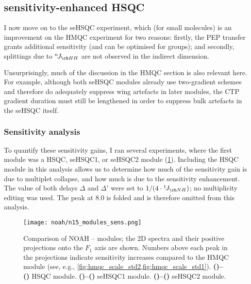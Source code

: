 \subsection{\texorpdfstring{\nitrogen{}}{15N} sensitivity-enhanced HSQC}
\label{subsec:noah__sehsqc_n}

I now move on to the \nitrogen{} seHSQC experiment, which (for small molecules) is an improvement on the HMQC experiment for two reasons: firstly, the PEP transfer grants additional sensitivity (and can be optimised for  groups); and secondly, splittings due to $\nJ{HH}$ are not observed in the indirect dimension.

Unsurprisingly, much of the discussion in the HMQC section is also relevant here.
For example, although both seHSQC modules already use two-gradient schemes and therefore do adequately suppress wing artefacts in later modules, the CTP gradient duration must still be lengthened in order to suppress bulk artefacts in the seHSQC itself.

\subsubsection{Sensitivity analysis}

To quantify these sensitivity gains, I ran several  experiments, where the first module was a \nitrogen{} HSQC, seHSQC1, or seHSQC2 module (\cref{fig:n15_sens}).
Including the HSQC module in this analysis allows us to determine how much of the sensitivity gain is due to multiplet collapse, and how much is due to the sensitivity enhancement.
The value of both delays $\Delta$ and $\Delta'$ were set to $1 / (4 \cdot \oneJ{NH})$; no multiplicity editing was used.
The peak at \qty{8.0}{\ppm} is folded and is therefore omitted from this analysis.

\begin{figure}[!ht]
    \centering
    \texttt{[image: noah/n15\_modules\_sens.png]}%
    {\label{fig:n15_sens_hsqc}}%
    {\label{fig:n15_sens_hsqcp}}%
    {\label{fig:n15_sens_sehsqc1}}%
    {\label{fig:n15_sens_sehsqc1p}}%
    {\label{fig:n15_sens_sehsqc2}}%
    {\label{fig:n15_sens_sehsqc2p}}%
    \caption[Comparison of sensitivities of NOAH \nitrogen{} modules]{
        Comparison of NOAH \proton{}--\nitrogen{} modules; the 2D spectra and their positive projections onto the $F_1$ axis are shown.
        Numbers above each peak in the projections indicate sensitivity increases compared to the HMQC module (see, e.g., \cref{fig:hmqc_scale_std2,fig:hmqc_scale_std1}).
        \textbf{()--()} HSQC module.
        \textbf{()--()} seHSQC1 module.
        \textbf{()--()} seHSQC2 module.
    }
    \label{fig:n15_sens}
\end{figure}

